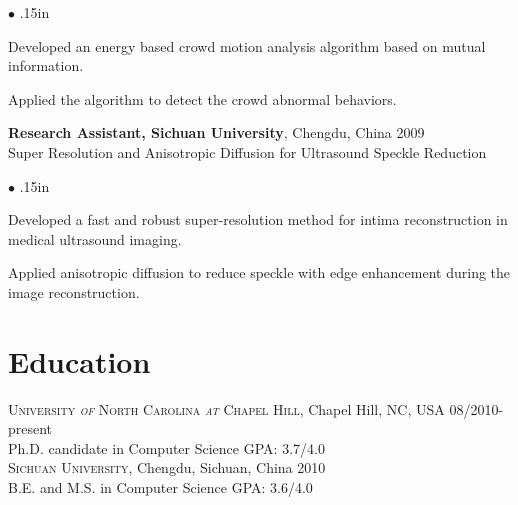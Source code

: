 \documentclass[line,margin]{res}
\newenvironment{bullets}{\begin{list}{\tiny$\bullet$}{\topsep 0pt \itemsep -2pt \leftmargin .15in}}{\vspace*{4pt}\end{list}}
\newenvironment{list1}{
  \begin{list}{\ding{113}}{%
      \setlength{\itemsep}{0in}
      \setlength{\parsep}{0in} \setlength{\parskip}{0in}
      \setlength{\topsep}{0in} \setlength{\partopsep}{0in} 
      \setlength{\leftmargin}{0.17in}}}{\end{list}}
\begin{document}
\begin{resume}
\begin{bullets}
\item Developed an energy based crowd motion analysis algorithm based on mutual information.
\item Applied the algorithm to detect the crowd abnormal behaviors.
\end{bullets}
\vspace{-.1in}
\textbf{Research Assistant, Sichuan University}, Chengdu, China \hfill      2009 \\%
Super Resolution and Anisotropic Diffusion for Ultrasound Speckle Reduction
\begin{bullets}
\item Developed a fast and robust super-resolution method for intima reconstruction in medical
ultrasound imaging. 
\item Applied anisotropic diffusion to reduce speckle with edge enhancement during the image reconstruction. 
\end{bullets} %

\vspace{-.1in}
\section{\sc Education}
\smallskip

\textsc{University \textit{of} North Carolina \textit{at} Chapel Hill}, Chapel Hill, NC, USA \hfill{08/2010-present}\\
Ph.D. candidate in Computer Science \hfill{GPA: 3.7/4.0}\\
\textsc{Sichuan University}, Chengdu, Sichuan, China \hfill {2010} \\
B.E. and M.S. in Computer Science  \hfill {GPA: 3.6/4.0}


\end{resume}
\end{document}
